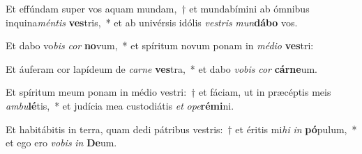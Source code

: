 \item Et effúndam super vos aquam mundam,~† et mundabímini ab ómnibus inquina\textit{mén}\textit{tis} \textbf{ves}tris,~* et ab univérsis idólis \textit{ves}\textit{tris} \textit{mun}\textbf{dá}\textbf{bo} vos.
\item Et dabo vo\textit{bis} \textit{cor} \textbf{no}vum,~* et spíritum novum ponam in \textit{mé}\textit{di}\textit{o} \textbf{ves}tri:
\item Et áuferam cor lapídeum de \textit{car}\textit{ne} \textbf{ves}tra,~* et dabo \textit{vo}\textit{bis} \textit{cor} \textbf{cár}\textbf{ne}um.
\item Et spíritum meum ponam in médio vestri:~† et fáciam, ut in præcéptis meis \textit{am}\textit{bu}\textbf{lé}tis,~* et judícia mea custodiátis \textit{et} \textit{o}\textit{pe}\textbf{ré}\textbf{mi}ni.
\item Et habitábitis in terra, quam dedi pátribus vestris:~† et éritis mi\textit{hi} \textit{in} \textbf{pó}pulum,~* et ego ero \textit{vo}\textit{bis} \textit{in} \textbf{De}um.

